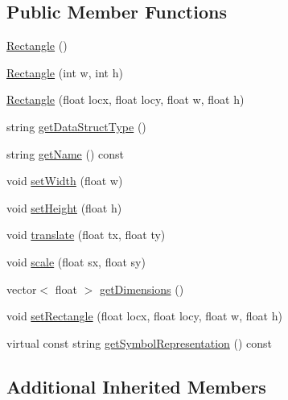 \subsection*{Public Member Functions}
\begin{DoxyCompactItemize}
\item 
\mbox{\hyperlink{classbridges_1_1datastructure_1_1_rectangle_a83c7e793c1335073c2a7093bbcf0c5bb}{Rectangle}} ()
\item 
\mbox{\hyperlink{classbridges_1_1datastructure_1_1_rectangle_a6e76090c00b4db625e96e4e23015acba}{Rectangle}} (int w, int h)
\item 
\mbox{\hyperlink{classbridges_1_1datastructure_1_1_rectangle_a65c907743708bbbece5ce86a935208a3}{Rectangle}} (float locx, float locy, float w, float h)
\item 
string \mbox{\hyperlink{classbridges_1_1datastructure_1_1_rectangle_a0c3b70d1d4d8ea9879eeb70a45c68d5a}{get\+Data\+Struct\+Type}} ()
\item 
string \mbox{\hyperlink{classbridges_1_1datastructure_1_1_rectangle_aee4fa283fa95e8c3b9f8efd5b19427b8}{get\+Name}} () const
\item 
void \mbox{\hyperlink{classbridges_1_1datastructure_1_1_rectangle_a7f6182e74816a6c7cf83ae49d5ed55be}{set\+Width}} (float w)
\item 
void \mbox{\hyperlink{classbridges_1_1datastructure_1_1_rectangle_a6a3e99759282dd822c5615d1643f2a81}{set\+Height}} (float h)
\item 
void \mbox{\hyperlink{classbridges_1_1datastructure_1_1_rectangle_a910c2a92c38e2e13bde3f1fd51b17316}{translate}} (float tx, float ty)
\item 
void \mbox{\hyperlink{classbridges_1_1datastructure_1_1_rectangle_ae17021407556e0d434b54a81d94614b3}{scale}} (float sx, float sy)
\item 
vector$<$ float $>$ \mbox{\hyperlink{classbridges_1_1datastructure_1_1_rectangle_a2afae03e3ddd9bebaed1e573e04bdbf3}{get\+Dimensions}} ()
\item 
void \mbox{\hyperlink{classbridges_1_1datastructure_1_1_rectangle_a01e49a75f3826ea63e581d3669e3626b}{set\+Rectangle}} (float locx, float locy, float w, float h)
\item 
virtual const string \mbox{\hyperlink{classbridges_1_1datastructure_1_1_rectangle_ada89ed40d2515a3518084f5460ba8dac}{get\+Symbol\+Representation}} () const
\end{DoxyCompactItemize}
\subsection*{Additional Inherited Members}



